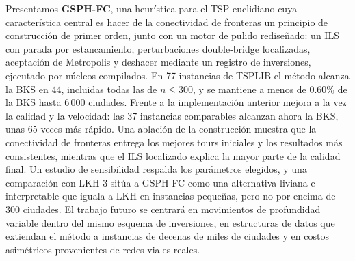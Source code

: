 \documentclass[runningheads]{llncs}
\begin{document}
Presentamos \textbf{GSPH-FC}, una heurística para el TSP euclidiano cuya
característica central es hacer de la conectividad de fronteras un
principio de construcción de primer orden, junto con un motor de pulido
rediseñado: un ILS con parada por estancamiento, perturbaciones
double-bridge localizadas, aceptación de Metropolis y deshacer mediante
un registro de inversiones, ejecutado por núcleos compilados. En 77
instancias de TSPLIB el método alcanza la BKS en 44, incluidas todas las
de $n\le 300$, y se mantiene a menos de 0.60\% de la BKS hasta 6\,000
ciudades. Frente a la implementación anterior mejora a la vez la calidad
y la velocidad: las 37 instancias comparables alcanzan ahora la BKS,
unas 65 veces más rápido. Una ablación de la construcción muestra que la
conectividad de fronteras entrega los mejores tours iniciales y los
resultados más consistentes, mientras que el ILS localizado explica la
mayor parte de la calidad final. Un estudio de sensibilidad respalda los
parámetros elegidos, y una comparación con LKH-3 sitúa a GSPH-FC como una
alternativa liviana e interpretable que iguala a LKH en instancias
pequeñas, pero no por encima de 300 ciudades. El trabajo futuro se
centrará en movimientos de profundidad variable dentro del mismo esquema
de inversiones, en estructuras de datos que extiendan el método a
instancias de decenas de miles de ciudades y en costos asimétricos
provenientes de redes viales reales.

%



\end{document}
